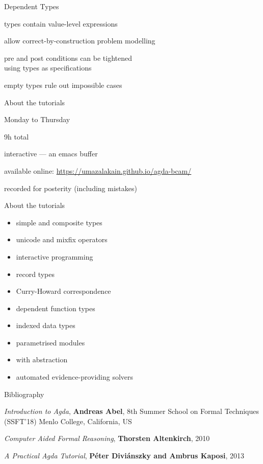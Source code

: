 \documentclass[dvipsnames]{beamer}
\newenvironment{wideitemize}{\itemize\addtolength{\itemsep}{1em}}{\enditemize}
\newcommand{\sitem}{\item[\raisebox{.45ex}{\rule{.6ex}{.6ex}}]}
\begin{document}
\begin{frame}{Dependent Types}
  \begin{wideitemize}
    \sitem types contain value-level expressions
    \sitem allow correct-by-construction problem modelling
    \sitem pre and post conditions can be tightened\\ using types as specifications 
    \sitem empty types rule out impossible cases
  \end{wideitemize}
\end{frame}

\begin{frame}{About the tutorials}
\begin{wideitemize}
  \sitem Monday to Thursday
  \sitem 9h total
  \sitem interactive --- an emacs buffer
  \sitem available online: \url{https://umazalakain.github.io/agda-bcam/}
  \sitem recorded for posterity (including mistakes)
\end{wideitemize}
\end{frame}

\begin{frame}{About the tutorials}
\begin{itemize}
  \sitem simple and composite types
  \sitem unicode and mixfix operators
  \sitem interactive programming
  \sitem record types
  \sitem Curry-Howard correspondence
  \sitem dependent function types
  \sitem indexed data types
  \sitem parametrised modules
  \sitem with abstraction
  \sitem automated evidence-providing solvers
\end{itemize}
\end{frame}

\begin{frame}{Bibliography}
\begin{wideitemize}
  \sitem \emph{Introduction to Agda}, \textbf{Andreas Abel}, 8th Summer School on Formal Techniques (SSFT’18) Menlo College, California, US
  \sitem \emph{Computer Aided Formal Reasoning}, \textbf{Thorsten Altenkirch}, 2010
  \sitem \emph{A Practical Agda Tutorial}, \textbf{Péter Diviánszky and Ambrus Kaposi}, 2013
\end{wideitemize}
\end{frame}
\end{document}
